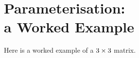 \chapter[Parameterisation: a Worked Example]{Parameterisation:\\a Worked Example}
\label{app:example}

Here is a worked example of a \(3 \times 3\) matrix.
